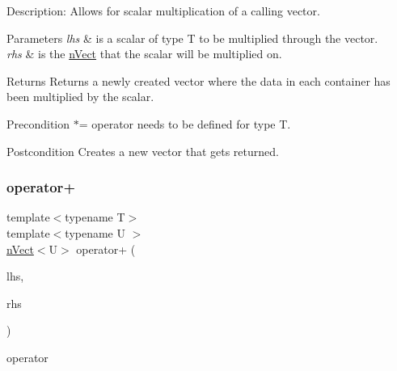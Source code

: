 Description\+: Allows for scalar multiplication of a calling vector. 
\begin{DoxyParams}{Parameters}
{\em lhs} & is a scalar of type T to be multiplied through the vector. \\
\hline
{\em rhs} & is the \hyperlink{classnVect}{n\+Vect} that the scalar will be multiplied on. \\
\hline
\end{DoxyParams}
\begin{DoxyReturn}{Returns}
Returns a newly created vector where the data in each container has been multiplied by the scalar. 
\end{DoxyReturn}
\begin{DoxyPrecond}{Precondition}
$\ast$= operator needs to be defined for type T. 
\end{DoxyPrecond}
\begin{DoxyPostcond}{Postcondition}
Creates a new vector that gets returned. 
\end{DoxyPostcond}
\mbox{\label{classnVect_a3ffde125079f1f4fdfc8e99d6a714439}} 
\subsubsection{\texorpdfstring{operator+}{operator+}}
{\footnotesize\ttfamily template$<$typename T$>$ \\
template$<$typename U $>$ \\
\hyperlink{classnVect}{n\+Vect}$<$U$>$ operator+ (\begin{DoxyParamCaption}\item[{const \hyperlink{classnVect}{n\+Vect}$<$ U $>$ \&}]{lhs,  }\item[{const \hyperlink{classnVect}{n\+Vect}$<$ U $>$ \&}]{rhs }\end{DoxyParamCaption})\hspace{0.3cm}{\ttfamily [friend]}}




\begin{DoxyItemize}
\item operator 
\end{DoxyItemize}

